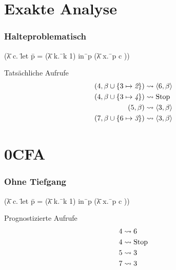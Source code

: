 \documentclass{beamer}
\begin{document}
\section{Exakte Analyse}

\begin{frame}
\frametitle{Halteproblematisch}

{\ttfamily
\begin{tabbing}
(\=λ c. \=let \=p = (\=λ k.\=\ k 1) in\=\ p (\=λ x.\=\ p c ))\\
\> \> \> \> \> \>  \>  \>  
\end{tabbing}
}

\begin{block}{Tatsächliche Aufrufe}
\begin{align*}
(4, \beta \cup \{ 3 \mapsto \textit 2\}) &\leadsto \langle6, \beta\rangle \\
(4, \beta \cup \{ 3 \mapsto \textit 4\}) &\leadsto \text{Stop} \\
(5, \beta) &\leadsto \langle3, \beta\rangle \\
(7, \beta \cup \{ 6 \mapsto \textit 3 \}) &\leadsto \langle3, \beta\rangle 
\end{align*}
\end{block}
\end{frame}

\section{0CFA}

\begin{frame}
\frametitle{Ohne Tiefgang}

{\ttfamily
\begin{tabbing}
(\=λ c. \=let \=p = (\=λ k.\=\ k 1) in\=\ p (\=λ x.\=\ p c ))\\
\> \> \> \> \> \>  \>  \>  
\end{tabbing}
}

\begin{block}{Prognostizierte Aufrufe}
\begin{align*}
4 &\leadsto 6 \\
4 &\leadsto \text{Stop} \\ 
5 &\leadsto 3 \\
7 &\leadsto 3
\end{align*}
\end{block}
\end{frame}
\end{document}
